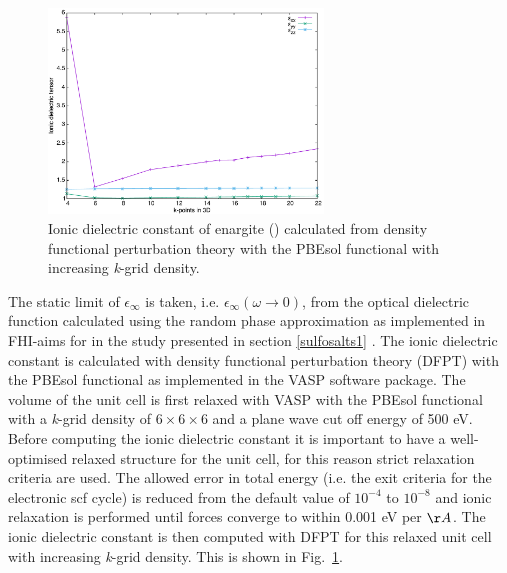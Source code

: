 \documentclass[11pt, twoside]{report}
\begin{document}
\begin{figure}[h!]
    \centering
    \includegraphics[width=0.65\textwidth]{figures/enargite_ionic_dielectric.pdf}
    \caption{Ionic dielectric constant of enargite ({\enargite}) calculated from density functional perturbation theory with the PBEsol functional with increasing \textit{k}-grid density.}
    \label{enargite_ionic_dielectric}
\end{figure}

The static limit of $\epsilon_{\infty}$ is taken, i.e.  $\epsilon_{\infty}(\omega \rightarrow 0)$, from the optical dielectric function calculated using the random phase approximation as implemented in FHI-aims for {\enargite} in the study presented in section \ref{sulfosalts1} \cite{sulfosalts_paper}.
The ionic dielectric constant is calculated with density functional perturbation theory (DFPT) with the PBEsol functional as implemented in the VASP \cite{VASP} software package. The volume of the unit cell is first relaxed with VASP with the PBEsol functional with a \textit{k}-grid density of $6\times6\times6$ and a plane wave cut off energy of 500 eV. Before computing the ionic dielectric constant it is important to have a well-optimised relaxed structure for the unit cell, for this reason strict relaxation criteria are used. The allowed error in total energy (i.e. the exit criteria for the electronic scf cycle) is reduced from the default value of $10^{-4}$ to $10^{-8}$ and ionic relaxation is performed until forces converge to within 0.001 eV per $\AA$. The ionic dielectric constant is then computed with DFPT for this relaxed unit cell with increasing \textit{k}-grid density. This is shown in Fig.~\ref{enargite_ionic_dielectric}.

\end{document}

